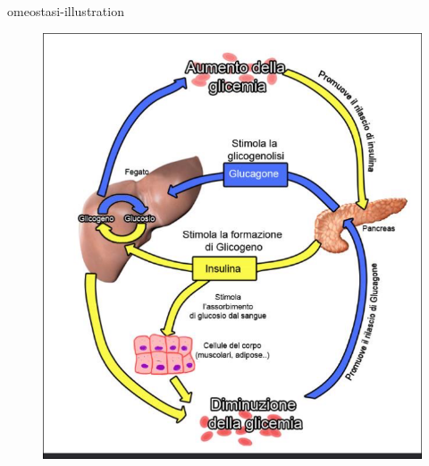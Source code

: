 \documentclass[preview]{standalone}
\begin{document}

\begin{snippet}{omeostasi-illustration}
    \begin{center}
    \begin{figure}[h]
        \centering
        \includegraphics[width=\textwidth]{./resources/omeostasi.png}
    \end{figure}
    \end{center}
\end{snippet}

\end{document}
